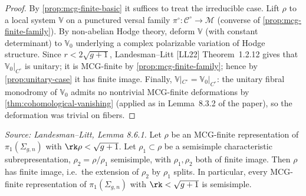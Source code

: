 \begin{proof}
  By \cref{prop:mcg-finite-basic} it suffices to treat the irreducible case.
  Lift $\rho$ to a local system $\mathbb{V}$ on a punctured versal family
  $\pi^\circ\colon \mathcal{C}^\circ \to \mathcal{M}$ (converse of
  \cref{prop:mcg-finite-family}).
  By non-abelian Hodge theory, deform $\mathbb{V}$ (with constant determinant)
  to $\mathbb{V}_0$ underlying a complex polarizable variation of Hodge
  structure.
  Since $r < 2\sqrt{g+1}$, Landesman--Litt [LL22] Theorem~1.2.12 gives that
  $\mathbb{V}_0|_{C^\circ}$ is unitary; it is MCG-finite by
  \cref{prop:mcg-finite-family}; hence by \cref{prop:unitary-case} it has
  finite image.
  Finally, $\mathbb{V}|_{C^\circ} = \mathbb{V}_0|_{C^\circ}$: the unitary
  fibral monodromy of $\mathbb{V}_0$ admits no nontrivial MCG-finite
  deformations by \cref{thm:cohomological-vanishing} (applied as in
  Lemma~8.3.2 of the paper), so the deformation was trivial on fibers.
\end{proof}

\begin{lemma}
  \label{lem:semisimplicity}
  \textit{Source: Landesman--Litt, Lemma 8.6.1.}
  Let $\rho$ be an MCG-finite representation of $\pi_1(\Sigma_{g,n})$ with
  $\rk\rho < \sqrt{g+1}$.
  Let $\rho_1 \subset \rho$ be a semisimple characteristic subrepresentation,
  $\rho_2 = \rho/\rho_1$ semisimple, with $\rho_1, \rho_2$ both of finite
  image.
  Then $\rho$ has finite image, i.e.\ the extension of $\rho_2$ by $\rho_1$
  splits.
  In particular, every MCG-finite representation of $\pi_1(\Sigma_{g,n})$
  with $\rk < \sqrt{g+1}$ is semisimple.
\end{lemma}


